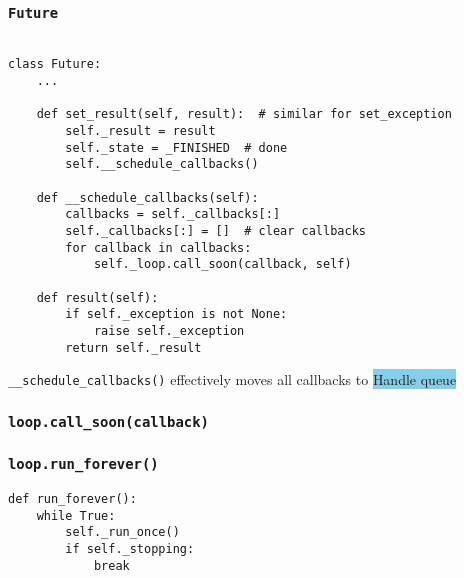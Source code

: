 \documentclass[compress,usenames,dvipsnames]{beamer}
\begin{document}
\begin{frame}
    \frametitle{\lstinline{Future}}
    \scriptsize
    \begin{lstlisting}

class Future:
    ...

    def set_result(self, result):  # similar for set_exception
        self._result = result
        self._state = _FINISHED  # done
        self.__schedule_callbacks()

    def __schedule_callbacks(self):
        callbacks = self._callbacks[:]
        self._callbacks[:] = []  # clear callbacks
        for callback in callbacks:
            self._loop.call_soon(callback, self)

    def result(self):
        if self._exception is not None:
            raise self._exception
        return self._result
    \end{lstlisting}
\lstinline{__schedule_callbacks()} effectively moves all callbacks to \colorbox{SkyBlue}{Handle queue}
\end{frame}

\begin{frame}[plain]
    \frametitle{\lstinline{loop.call_soon(callback)}}
    \begin{algorithm}[H]
        \SetAlgoNoEnd
        \DontPrintSemicolon
    \end{algorithm}
\end{frame}

\begin{frame}
    \frametitle{\lstinline{loop.run_forever()}}
    \begin{lstlisting}
def run_forever():
    while True:
        self._run_once()
        if self._stopping:
            break
    \end{lstlisting}
\end{frame}
\end{document}
